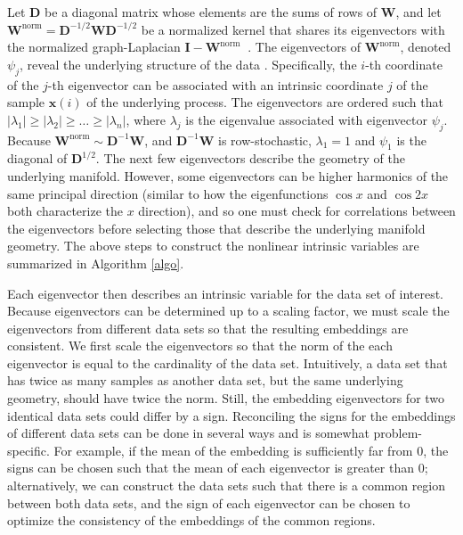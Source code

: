 \documentclass[aip,jcp,preprint]{revtex4-1}
\begin{document}
Let $\mathbf{D}$ be a diagonal matrix whose elements are the sums of rows of $\mathbf{W}$, and let $\mathbf{W}^{\mathrm{norm}} = \mathbf{D}^{-1/2}\mathbf{W}\mathbf{D}^{-1/2}$
be a normalized kernel that shares its eigenvectors with the normalized graph-Laplacian $\mathbf{I}-\mathbf{W}^{\mathrm{norm}} \:$ \cite{chung1997spectral}.
%
The eigenvectors of $\mathbf{W}^{\mathrm{norm}}$, denoted $\psi_j$, reveal the underlying structure of the data \cite{coifman2005geometric}.
%
Specifically, the $i$-th coordinate of the $j$-th eigenvector can be associated with an intrinsic coordinate $j$ of the sample $\mathbf{x}(i)$ of the underlying process.
%
The eigenvectors are ordered such that $|\lambda_1| \ge |\lambda_2| \ge \dots \ge |\lambda_n|$, where $\lambda_j$ is the eigenvalue associated with eigenvector $\psi_j$.
%
Because $\mathbf{W}^{\mathrm{norm}} \sim \mathbf{D}^{-1}\mathbf{W} $, and $\mathbf{D}^{-1}\mathbf{W}$ is row-stochastic,
$\lambda_1 = 1$ and $\psi_1$ is the diagonal of $\mathbf{D}^{1/2}$.
%
The next few eigenvectors describe the geometry of the underlying manifold.
%
However, some eigenvectors can be higher harmonics of the same principal direction (similar to how the eigenfunctions $\cos x$ and $\cos 2x$ both characterize the $x$ direction),
and so one must check for correlations between the eigenvectors before selecting those that describe the underlying manifold geometry.
%
The above steps to construct the nonlinear intrinsic variables are summarized in Algorithm \ref{algo}.

Each eigenvector then describes an intrinsic variable for the data set of interest.
%
Because eigenvectors can be determined up to a scaling factor, we must scale the eigenvectors from different data sets so that the resulting embeddings are consistent.
%
We first scale the eigenvectors so that the norm of the each eigenvector is equal to the cardinality of the data set.
%
Intuitively, a data set that has twice as many samples as another data set, but the same underlying geometry, should have twice the norm.
%
Still, the embedding eigenvectors for two identical data sets could differ by a sign.
%
Reconciling the signs for the embeddings of different data sets can be done in several ways and is somewhat problem-specific.
%
For example, if the mean of the embedding is sufficiently far from 0, the signs can be chosen such that the mean of each eigenvector is greater than 0;
alternatively, we can construct the data sets such that there is a common region between both data sets, and the sign of each eigenvector can be chosen to optimize the consistency of the embeddings of the common regions.
\end{document}
